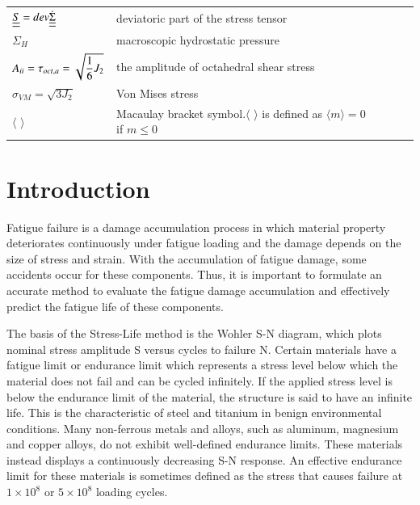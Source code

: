 \documentclass[3p,times,number,review]{elsarticle}
\begin{document}
\begin{flushleft}
\begin{table}[h]
\begin{tabular}{lllll}
$\uline{\uline{S}}=dev\dot{\uline{\uline{\Sigma}}}$ & deviatoric part of the stress tensor &  &  &  \\
$\Sigma_H$& macroscopic hydrostatic pressure &  &  &  \\
$A_{\uppercase\expandafter{\romannumeral2}}=\tau_{oct,a}=\sqrt{\dfrac{1}{6}J_{2}}$& the amplitude of octahedral shear stress &  &  &  \\
$\sigma_{VM}=\sqrt{3J_{2}}$& Von Mises stress &  &  &  \\
$\langle$ $\rangle$& Macaulay bracket symbol.$\langle$ $\rangle$ is defined as $\langle m\rangle=0$ if $m\leqslant0$
\end{tabular}
\end{table}
\end{flushleft}

\clearpage
\section{Introduction}

Fatigue failure is a damage accumulation process in which material property deteriorates continuously under fatigue loading and the damage depends on the size of stress and strain. With the accumulation of fatigue damage, some accidents occur for these components. Thus, it is important to formulate an accurate method to evaluate the fatigue damage accumulation and effectively predict the fatigue life of these components.

The basis of the Stress-Life method is the Wohler S-N diagram, which plots nominal stress amplitude S versus cycles to failure N. Certain materials have a fatigue limit or endurance limit which represents a stress level below which the material does not fail and can be cycled infinitely. If the applied stress level is below the endurance limit of the material, the structure is said to have an infinite life. This is the characteristic of steel and titanium in benign environmental conditions. Many non-ferrous metals and alloys, such as aluminum, magnesium and copper alloys, do not exhibit well-defined endurance limits. These materials instead displays a continuously decreasing S-N response. An effective endurance limit for these materials is sometimes defined as the stress that causes failure at $1\times10^8$ or $5\times10^8$ loading cycles.
\end{document}
